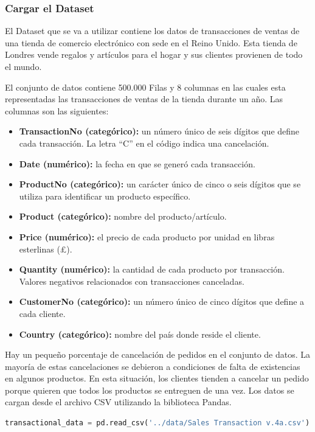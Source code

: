 \subsubsection{Cargar el Dataset}

El Dataset que se va a utilizar contiene los datos de transacciones de ventas de una tienda de comercio electrónico con sede en el Reino Unido. Esta tienda de Londres vende regalos y artículos para el hogar y sus clientes provienen de todo el mundo.

El conjunto de datos contiene 500.000 Filas y 8 columnas en las cuales esta representadas las transacciones de ventas de la tienda durante un año. Las columnas son las siguientes:

\begin{itemize}
	\item \textbf{TransactionNo (categórico):} un número único de seis dígitos que define cada transacción. La letra “C” en el código indica una cancelación.
	\item \textbf{Date (numérico):} la fecha en que se generó cada transacción.
	\item \textbf{ProductNo (categórico):} un carácter único de cinco o seis dígitos que se utiliza para identificar un producto específico.
	\item \textbf{Product (categórico):} nombre del producto/artículo.
	\item \textbf{Price (numérico):} el precio de cada producto por unidad en libras esterlinas (£).
	\item \textbf{Quantity (numérico):} la cantidad de cada producto por transacción. Valores negativos relacionados con transacciones canceladas.
	\item \textbf{CustomerNo (categórico):}  un número único de cinco dígitos que define a cada cliente.
	\item \textbf{Country (categórico):} nombre del país donde reside el cliente.
\end{itemize}

Hay un pequeño porcentaje de cancelación de pedidos en el conjunto de datos. La mayoría de estas cancelaciones se debieron a condiciones de falta de existencias en algunos productos. En esta situación, los clientes tienden a cancelar un pedido porque quieren que todos los productos se entreguen de una vez. Los datos se cargan desde el archivo CSV utilizando la biblioteca Pandas.

\begin{lstlisting}[language=Python, caption=Cargar Dataset en modelo.ipynb]
transactional_data = pd.read_csv('../data/Sales Transaction v.4a.csv')
\end{lstlisting}

